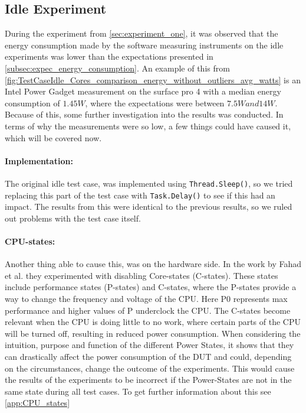 \subsection{Idle Experiment}

During the experiment from \cref{sec:experiment_one}, it was observed that the energy consumption made by the software measuring instruments on the idle experiments was lower than the expectations presented in \cref{subsec:expec_energy_consumption}. An example of this from \cref*{fig:TestCaseIdle_Cores_comparison_energy_without_outliers_avg_watts} is an Intel Power Gadget measurement on the surface pro 4 with a median energy consumption of $1.45W$, where the expectations were between $7.5W and 14W$. Because of this, some further investigation into the results was conducted. In terms of why the measurements were so low, a few things could have caused it, which will be covered now.



\paragraph{Implementation:} The original idle test case, was implemented using \texttt{Thread.Sleep()}, so we tried replacing this part of the test case with \texttt{Task.Delay()} to see if this had an impact. The results from this were identical to the previous results, so we ruled out problems with the test case itself.



\paragraph{CPU-states:} Another thing able to cause this, was on the hardware side. In the work by Fahad et al.\cite*[]{fahad2019comparative} they experimented with disabling Core-states (C-states). These states include performance states (P-states) and C-states\cite[]{PCStat}, where the P-states provide a way to change the frequency and voltage of the CPU. Here P0 represents max performance and higher values of P underclock the CPU. The C-states become relevant when the CPU is doing little to no work, where certain parts of the CPU will be turned off, resulting in reduced power consumption. When considering the intuition, purpose and function of the different Power States, it shows that they can drastically affect the power consumption of the DUT and could, depending on the circumstances, change the outcome of the experiments. This would cause the results of the experiments to be incorrect if the Power-States are not in the same state during all test cases. To get further information about this see \cref{app:CPU_states}


